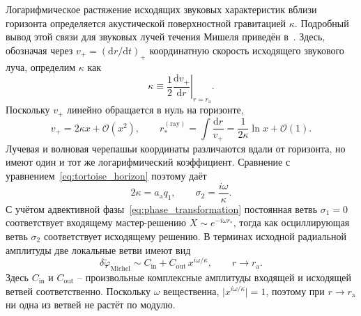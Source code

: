 \documentclass[12pt,a4paper,preprint,nopreprintline]{elsarticle}
\begin{document}
Логарифмическое растяжение исходящих звуковых характеристик вблизи горизонта определяется акустической поверхностной гравитацией $\kappa$. Подробный вывод этой связи для звуковых лучей течения Мишеля приведён в~\cite{SemyannikovAV_AcousticGeometryAndSoundRayDynamics_2026}. Здесь, обозначая через $v_{+}=(\mathrm{d}r/\mathrm{d}t)_{+}$ координатную скорость исходящего звукового луча, определим $\kappa$ как
\begin{equation}
    \kappa
    \equiv
    \frac{1}{2}
    \left.
    \frac{\mathrm{d}v_{+}}{\mathrm{d}r}
    \right|_{r=r_{\mathrm{a}}}.
    \label{eq:acoustic_surface_gravity}
\end{equation}
Поскольку $v_{+}$ линейно обращается в нуль на горизонте,
\begin{equation}
    v_{+}=2\kappa x+\mathcal{O}(x^{2}),
    \qquad
    r_{*}^{\mathrm{(ray)}}
    =
    \int\frac{\mathrm{d}r}{v_{+}}
    =
    \frac{1}{2\kappa}\ln x+\mathcal{O}(1).
\end{equation}
Лучевая и волновая черепашьи координаты различаются вдали от горизонта, но имеют один и тот же логарифмический коэффициент. Сравнение с уравнением~\eqref{eq:tortoise_horizon} поэтому даёт
\begin{equation}
    2\kappa=a_{\mathrm{a}}q_{1},
    \qquad
    \sigma_{2}=\frac{i\omega}{\kappa}.
    \label{eq:horizon_exponent_surface_gravity}
\end{equation}
С учётом адвективной фазы~\eqref{eq:phase_transformation} постоянная ветвь $\sigma_{1}=0$ соответствует входящему мастер-решению $X\sim e^{-i\omega r_{*}}$, тогда как осциллирующая ветвь $\sigma_{2}$ соответствует исходящему решению. В терминах исходной радиальной амплитуды две локальные ветви имеют вид
\begin{equation}
    \delta\widetilde{\varphi}_{\mathrm{Michel}}
    \sim
    C_{\mathrm{in}}
    +
    C_{\mathrm{out}}\,x^{i\omega/\kappa},
    \qquad
    r \rightarrow r_{\mathrm{a}}.
    \label{eq:michel_local_branches}
\end{equation}
Здесь $C_{\mathrm{in}}$ и $C_{\mathrm{out}}$ -- произвольные комплексные амплитуды входящей и исходящей ветвей соответственно. Поскольку $\omega$ вещественна, $\lvert x^{i\omega/\kappa}\rvert=1$, поэтому при $r\rightarrow r_{\mathrm{a}}$ ни одна из ветвей не растёт по модулю.
\end{document}
